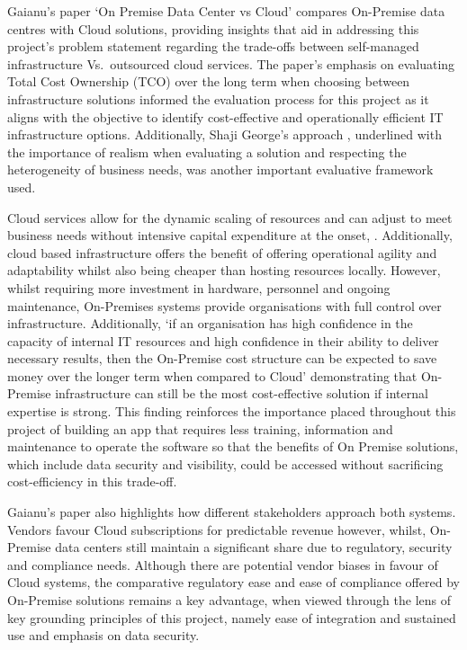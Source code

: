 \documentclass{report}
\begin{document}
Gaianu's paper `On Premise Data Center vs Cloud' compares On-Premise data centres with Cloud solutions, providing insights that aid in addressing this project's problem statement regarding the trade-offs between self-managed infrastructure Vs.\ outsourced cloud services. 
The paper's emphasis on evaluating Total Cost Ownership (TCO) over the long term when choosing between infrastructure solutions \parencite{gaianuPremiseDataCenter2023a} informed the evaluation process for this project as it aligns with the objective to identify cost-effective and operationally efficient IT infrastructure options. 
Additionally, Shaji George's approach \parencite{georgeCloudComedownUnderstanding2024}, underlined with the importance of realism when evaluating a solution and respecting the heterogeneity of business needs, was another important evaluative framework used. 
  
Cloud services allow for the dynamic scaling of resources and can adjust to meet business needs without intensive capital expenditure at the onset\parencite{gaianuPremiseDataCenter2023a}, \parencite{georgeCloudComedownUnderstanding2024}. 
Additionally, cloud based infrastructure offers the benefit of offering operational agility and adaptability whilst also being cheaper than hosting resources locally. 
However, whilst requiring more investment in hardware, personnel and ongoing maintenance, On-Premises systems provide organisations with full control over infrastructure. 
Additionally, `if an organisation has high confidence in the capacity of internal IT resources and high confidence in their ability to deliver necessary results, then the On-Premise cost structure can be expected to save money over the longer term when compared to Cloud' \parencite{gaianuPremiseDataCenter2023a} demonstrating that On-Premise infrastructure can still be the most cost-effective solution if internal expertise is strong. 
This finding reinforces the importance placed throughout this project of building an app that requires less training, information and maintenance to operate the software so that the benefits of On Premise solutions, which include data security and visibility, could be accessed without sacrificing cost-efficiency in this trade-off.

Gaianu's paper also highlights  how different stakeholders approach both systems. 
Vendors favour Cloud subscriptions for predictable revenue however, whilst, On-Premise data centers still maintain a significant share due to regulatory, security and compliance needs. 
Although there are potential vendor biases in favour of Cloud systems, the comparative regulatory ease and ease of compliance offered by On-Premise solutions remains a key advantage, when viewed through the lens of key grounding principles of this project, namely ease of integration and sustained use and emphasis on data security. 
\end{document}
